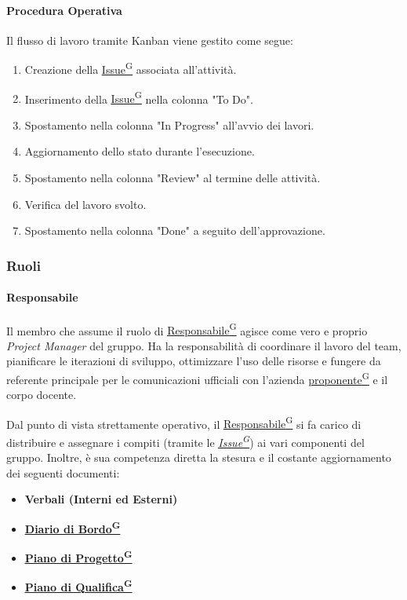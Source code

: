 \documentclass[a4paper,12pt]{article}
\providecommand{\glslink}[2]{\href{https://alittlebyte-19.github.io/Documentazione/glossario.html\#gls-#1}{\underline{#2}\textsuperscript{\scriptsize G}}}
\begin{document}
\paragraph{Procedura Operativa}
Il flusso di lavoro tramite Kanban viene gestito come segue:

\begin{enumerate}
    \item Creazione della \glslink{issue}{Issue} associata all'attività.
    \item Inserimento della \glslink{issue}{Issue} nella colonna "To Do".
    \item Spostamento nella colonna "In Progress" all'avvio dei lavori.
    \item Aggiornamento dello stato durante l'esecuzione.
    \item Spostamento nella colonna "Review" al termine delle attività.
    \item Verifica del lavoro svolto.
    \item Spostamento nella colonna "Done" a seguito dell'approvazione.
\end{enumerate}

\subsubsection{Ruoli}

\paragraph{Responsabile}
Il membro che assume il ruolo di \glslink{responsabile}{Responsabile} agisce come vero e proprio \textit{Project Manager} del gruppo. Ha la responsabilità di coordinare il lavoro del team, pianificare le iterazioni di sviluppo, ottimizzare l'uso delle risorse e fungere da referente principale per le comunicazioni ufficiali con l'azienda \glslink{committente-proponente}{proponente} e il corpo docente.

Dal punto di vista strettamente operativo, il \glslink{responsabile}{Responsabile} si fa carico di distribuire e assegnare i compiti (tramite le \textit{\glslink{issue}{Issue}}) ai vari componenti del gruppo. Inoltre, è sua competenza diretta la stesura e il costante aggiornamento dei seguenti documenti:

\begin{itemize}
    \item \textbf{Verbali (Interni ed Esterni)}
    \item \textbf{\glslink{diario-di-bordo}{Diario di Bordo}}
    \item \textbf{\glslink{piano-di-progetto}{Piano di Progetto}}
    \item \textbf{\glslink{piano-di-qualifica}{Piano di Qualifica}}
\end{itemize}
\end{document}
